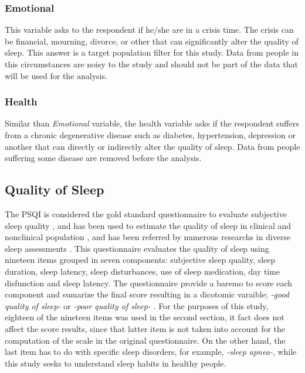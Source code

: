 \documentclass[]{book}
\begin{document}
\subsubsection{Emotional}\label{emotional}

This variable asks to the respondent if he/she are in a crisis time. The
crisis can be financial, mourning, divorce, or other that can
significantly alter the quality of sleep. This answer is a target
population filter for this study. Data from people in this circumstances
are noisy to the study and should not be part of the data that will be
used for the analysis.

\subsubsection{Health}\label{health}

Similar than \emph{Emotional} variable, the health variable asks if the
respondent suffers from a chronic degenerative disease such as diabetes,
hypertension, depression or another that can directly or indirectly
alter the quality of sleep. Data from people suffering some disease are
removed before the analysis.

\subsection{Quality of Sleep}\label{quality-of-sleep}

The PSQI is considered the gold standard questionnaire to evaluate
subjective sleep quality \citep{Cameron2010}, and has been used to
estimate the quality of sleep in clinical and nonclinical population
\citep{mastin2006}, and has been referred by numerous researchs in
diverse sleep assessments \citep{bai2012}. This questionnaire evaluates
the quality of sleep using nineteen items grouped in seven components:
subjective sleep quality, sleep duration, sleep latency, sleep
disturbances, use of sleep medication, day time disfunction and sleep
latency. The questionnaire provide a baremo to score each component and
sumarize the final score resulting in a dicotomic varaible; \emph{-good
quality of sleep-} or \emph{-poor quality of sleep-} \citep{psqi1989}.
For the purposes of this study, eighteen of the nineteen items was used
in the second section, it fact does not affect the score results, since
that latter item is not taken into account for the computation of the
scale in the original questionnaire. On the other hand, the last item
has to do with specific sleep disorders, for example, \emph{-sleep
apnea-}, while this study seeks to understand sleep habits in healthy
people.
\end{document}
